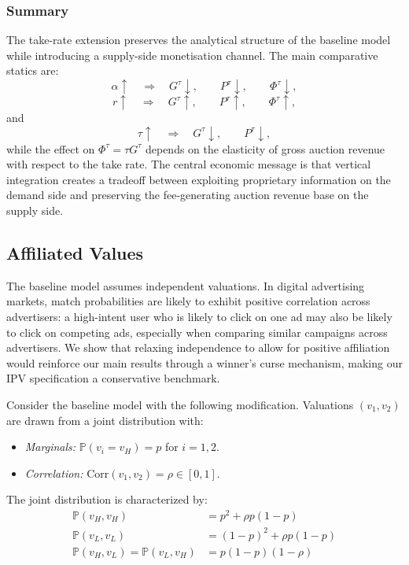 \subsubsection{Summary}

The take-rate extension preserves the analytical structure of the baseline model while introducing
a supply-side monetisation channel. The main comparative statics are:
\[
\alpha\uparrow
\quad\Longrightarrow\quad
G^\tau\downarrow,\qquad
P^\tau\downarrow,\qquad
\Phi^\tau\downarrow,
\]
\[
r\uparrow
\quad\Longrightarrow\quad
G^\tau\uparrow,\qquad
P^\tau\uparrow,\qquad
\Phi^\tau\uparrow,
\]
and
\[
\tau\uparrow
\quad\Longrightarrow\quad
G^\tau\downarrow,\qquad
P^\tau\downarrow,
\]
while the effect on $\Phi^\tau=\tau G^\tau$ depends on the elasticity of gross auction revenue
with respect to the take rate. The central economic message is that vertical integration creates a
tradeoff between exploiting proprietary information on the demand side and preserving the
fee-generating auction revenue base on the supply side.

\subsection{Affiliated Values}\label{sect:affiliated-values}

The baseline model assumes independent valuations. In digital advertising markets, match probabilities are likely to exhibit positive correlation across advertisers: a high-intent user who is likely to click on one ad may also be likely to click on competing ads, especially when comparing similar campaigns across advertisers. We show that relaxing independence to allow for positive affiliation would reinforce our main results through a winner's curse mechanism, making our IPV specification a conservative benchmark.

\noindent Consider the baseline model with the following modification. Valuations $(v_1, v_2)$ are drawn from a joint distribution with:
\begin{itemize}
    \item \emph{Marginals:} $\mathbb{P}(v_i = v_H) = p$ for $i = 1, 2$.
    \item \emph{Correlation:} $\text{Corr}(v_1, v_2) = \rho \in [0, 1]$.
\end{itemize}

\noindent The joint distribution is characterized by:
\begin{align*}
    \mathbb{P}(v_H, v_H) &= p^2 + \rho p(1-p) \\
    \mathbb{P}(v_L, v_L) &= (1-p)^2 + \rho p(1-p) \\
    \mathbb{P}(v_H, v_L) = \mathbb{P}(v_L, v_H) &= p(1-p)(1 - \rho)
\end{align*}

